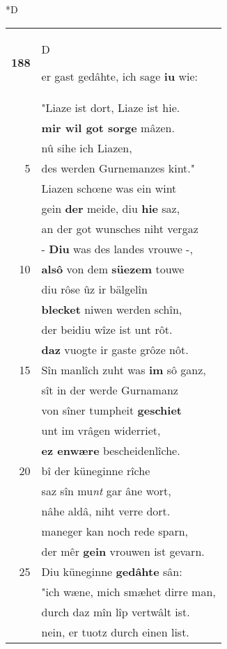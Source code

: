 \documentclass[8pt,a4paper,notitlepage]{article}
\begin{document}
\begin{table}[ht]
\begin{minipage}[t]{0.5\linewidth}
\small
\begin{center}*D
\end{center}
\begin{tabular}{rl}
\textbf{188} & \begin{large}D\end{large}er gast gedâhte, ich sage \textbf{iu} wie:\\ 
 & "Liaze ist dort, Liaze ist hie.\\ 
 & \textbf{mir wil got sorge} mâzen.\\ 
 & nû sihe ich Liazen,\\ 
5 & des werden Gurnemanzes kint."\\ 
 & Liazen schœne was ein wint\\ 
 & gein \textbf{der} meide, diu \textbf{hie} saz,\\ 
 & an der got wunsches niht vergaz\\ 
 & - \textbf{Diu} was des landes vrouwe -,\\ 
10 & \textbf{alsô} von dem \textbf{süezem} touwe\\ 
 & diu rôse ûz ir bälgelîn\\ 
 & \textbf{blecket} niwen werden schîn,\\ 
 & der beidiu wîze ist unt rôt.\\ 
 & \textbf{daz} vuogte ir gaste grôze nôt.\\ 
15 & Sîn manlîch zuht was \textbf{im} sô ganz,\\ 
 & sît in der werde Gurnamanz\\ 
 & von sîner tumpheit \textbf{geschiet}\\ 
 & unt im vrâgen widerriet,\\ 
 & \textbf{ez enwære} bescheidenlîche.\\ 
20 & bî der küneginne rîche\\ 
 & saz sîn mu\textit{nt} gar âne wort,\\ 
 & nâhe aldâ, niht verre dort.\\ 
 & maneger kan noch rede sparn,\\ 
 & der mêr \textbf{gein} vrouwen ist gevarn.\\ 
25 & Diu küneginne \textbf{gedâhte} sân:\\ 
 & "ich wæne, mich smæhet dirre man,\\ 
 & durch daz mîn lîp vertwâlt ist.\\ 
 & nein, er tuotz durch einen list.\\ 

\end{tabular}
\end{minipage}
\end{table}
\end{document}
